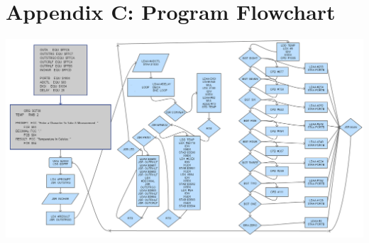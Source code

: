 \documentclass[12pt]{report}
\begin{document}
\section*{Appendix C: Program Flowchart}
	\begin{center}
		\includegraphics[scale=.40]{f.PNG}
	\end{center}
\end{document}
